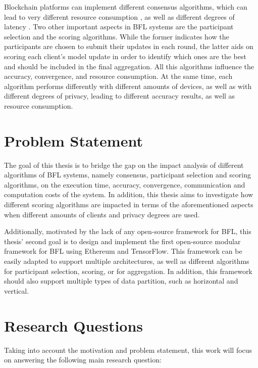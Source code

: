 Blockchain platforms can implement different consensus algorithms, which can lead to very different resource consumption \cite{ccaf}, as well as different degrees of latency \cite{Alqahtani_2021}. Two other important aspects in BFL systems are the participant selection and the scoring algorithms. While the former indicates how the participants are chosen to submit their updates in each round, the latter aids on scoring each client's model update in order to identify which ones are the best and should be included in the final aggregation. All this algorithms influence the accuracy, convergence, and resource consumption. At the same time, each algorithm performs differently with different amounts of devices, as well as with different degrees of privacy, leading to different accuracy results, as well as resource consumption.

\section{Problem Statement}\label{intro:problem}

The goal of this thesis is to bridge the gap on the impact analysis of different algorithms of BFL systems, namely consensus, participant selection and scoring algorithms, on the execution time, accuracy, convergence, communication and computation costs of the system. In addition, this thesis aims to investigate how different scoring algorithms are impacted in terms of the aforementioned aspects when different amounts of clients and privacy degrees are used.

Additionally, motivated by the lack of any open-source framework for BFL, this thesis' second goal is to design and implement the first open-source modular framework for BFL using Ethereum\cite{wood2014ethereum} and TensorFlow\cite{tensorflow2015-whitepaper}. This framework can be easily adapted to support multiple architectures, as well as different algorithms for participant selection, scoring, or for aggregation. In addition, this framework should also support multiple types of data partition, such as horizontal and vertical.

\section{Research Questions}\label{intro:questions}

Taking into account the motivation and problem statement, this work will focus on answering the following main research question:

